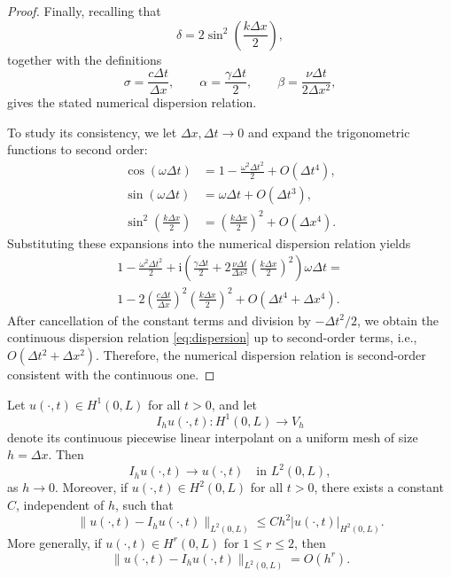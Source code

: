 \documentclass{Configuration_Files/PoliMi3i_thesis}
\begin{document}
\begin{proof}
Finally, recalling that
\begin{equation*}
\delta
=
2\sin^2\!\left(\frac{k\Delta x}{2}\right),
\end{equation*}
together with the definitions
\begin{equation*}
\sigma=\frac{c\Delta t}{\Delta x},
\qquad
\alpha=\frac{\gamma\Delta t}{2},
\qquad
\beta=\frac{\nu\Delta t}{2\Delta x^2},
\end{equation*}
gives the stated numerical dispersion relation.

To study its consistency, we let $\Delta x,\Delta t\rightarrow0$ and expand the
trigonometric functions to second order:
\begin{align*}
\cos(\omega\Delta t)
&=
1-\frac{\omega^2\Delta t^2}{2}
+
O(\Delta t^4),\\
\sin(\omega\Delta t)
&=
\omega\Delta t
+
O(\Delta t^3),\\
\sin^2\!\left(\frac{k\Delta x}{2}\right)
&=
\left(\frac{k\Delta x}{2}\right)^2
+
O(\Delta x^4).
\end{align*}
Substituting these expansions into the numerical dispersion relation yields
\begin{multline}
1
-
\frac{\omega^2\Delta t^2}{2}
+
\mathrm{i}
\left(
\frac{\gamma\Delta t}{2}
+
2\frac{\nu\Delta t}{\Delta x^2}
\left(\frac{k\Delta x}{2}\right)^2
\right)
\omega\Delta t
= \\
1
-
2
\left(
\frac{c\Delta t}{\Delta x}
\right)^2
\left(\frac{k\Delta x}{2}\right)^2
+
O(\Delta t^4+\Delta x^4).
\end{multline}
After cancellation of the constant terms and division by
$-\Delta t^2/2$, we obtain the continuous dispersion relation \eqref{eq:dispersion} up to second-order terms, i.e., \(O(\Delta t^2+\Delta x^2)\). Therefore, the numerical dispersion relation is second-order consistent
with the continuous one.
\end{proof}

\begin{proposition}
Let $u(\cdot,t) \in H^1(0,L)$ for all $t > 0$, and let
\[
I_h u(\cdot,t) : H^1(0,L) \to V_h
\]
denote its continuous piecewise linear interpolant on a uniform mesh of size $h = \Delta x$. Then
\[
I_h u(\cdot,t) \to u(\cdot,t) \quad \text{in } L^2(0,L),
\]
as $h \to 0$. Moreover, if $u(\cdot,t) \in H^2(0,L)$ for all $t > 0$, there exists a constant $C$, independent of $h$, such that
\[
\|u(\cdot,t) - I_h u(\cdot,t)\|_{L^2(0,L)} \le Ch^2 |u(\cdot,t)|_{H^2(0,L)}.
\]
More generally, if $u(\cdot,t) \in H^r(0,L)$ for $1 \le r \le 2$, then
\[
\|u(\cdot,t) - I_h u(\cdot,t)\|_{L^2(0,L)} = O(h^r).
\]
\end{proposition}
\end{document}
